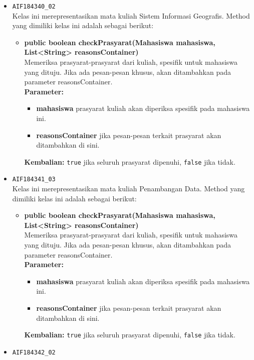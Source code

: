 \begin{enumerate}
\begin{itemize}
\begin{itemize}
		\end{itemize}
		\item \texttt{AIF184340\_02} \\
		Kelas ini merepresentasikan mata kuliah Sistem Informasi Geografis. Method yang dimiliki kelas ini adalah sebagai berikut: 
		\begin{itemize}
			\item \textbf{public boolean checkPrasyarat(Mahasiswa mahasiswa, List<String> reasonsContainer)}\\
			Memeriksa prasyarat-prasyarat dari kuliah, spesifik untuk mahasiswa yang dituju. Jika ada pesan-pesan khusus, akan ditambahkan pada parameter reasonsContainer.\\
			\textbf{Parameter:}
			\begin{itemize}
				\item \textbf{mahasiswa} prasyarat kuliah akan diperiksa spesifik pada mahasiswa ini.
				\item \textbf{reasonsContainer} jika pesan-pesan terkait prasyarat akan ditambahkan di sini.
			\end{itemize}
			\textbf{Kembalian:} \texttt{true} jika seluruh prasyarat dipenuhi, \texttt{false} jika tidak.
		\end{itemize}
		\item \texttt{AIF184341\_03} \\
		Kelas ini merepresentasikan mata kuliah Penambangan Data. Method yang dimiliki kelas ini adalah sebagai berikut: 
		\begin{itemize}
			\item \textbf{public boolean checkPrasyarat(Mahasiswa mahasiswa, List<String> reasonsContainer)}\\
			Memeriksa prasyarat-prasyarat dari kuliah, spesifik untuk mahasiswa yang dituju. Jika ada pesan-pesan khusus, akan ditambahkan pada parameter reasonsContainer.\\
			\textbf{Parameter:}
			\begin{itemize}
				\item \textbf{mahasiswa} prasyarat kuliah akan diperiksa spesifik pada mahasiswa ini.
				\item \textbf{reasonsContainer} jika pesan-pesan terkait prasyarat akan ditambahkan di sini.
			\end{itemize}
			\textbf{Kembalian:} \texttt{true} jika seluruh prasyarat dipenuhi, \texttt{false} jika tidak.
		\end{itemize}
		\item \texttt{AIF184342\_02} \\

\end{itemize}
\end{enumerate}
